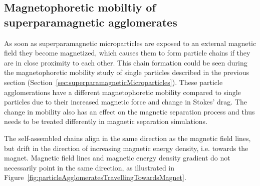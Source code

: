 \subsection{Magnetophoretic mobiltiy of superparamagnetic agglomerates}\label{subsec:magnetophoreticMobiltiyOfSuperparamagneticAgglomerates}
As soon as superparamagnetic microparticles are exposed to an external magnetic field they become magnetized, which causes them to form particle chains if they are in close proximity to each other. This chain formation could be seen during the magnetophoretic mobility study of single particles described in the previous section (Section~\ref{sec:superparamagneticMicroparticles}). These particle agglomerations have a different magnetophoretic mobility compared to single particles due to their increased magnetic force and change in Stokes' drag. The change in mobility also has an effect on the magnetic separation process and thus needs to be treated differently in magnetic separation simulations. 

The self-assembled chains align in the same direction as the magnetic field lines, but drift in the direction of increasing magnetic energy density, i.e. towards the magnet. Magnetic field lines and magnetic energy density gradient do not necessarily point in the same direction, as illustrated in Figure~\ref{fig:particleAgglomeratesTravellingTowardsMagnet}.

